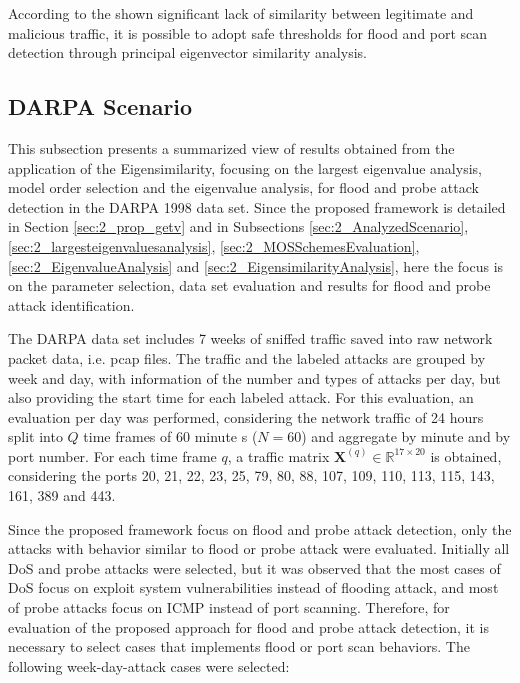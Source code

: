 According to the shown significant lack of similarity between legitimate and malicious traffic, it is possible to adopt safe thresholds for flood and port scan detection through principal eigenvector similarity analysis.

\subsection{DARPA Scenario}
\label{sec:2_DarpaEvaluation}

This subsection presents a summarized view of results obtained from the application of the Eigensimilarity, focusing on the largest eigenvalue analysis, model order selection and the eigenvalue analysis, for flood and probe attack detection in the DARPA 1998 data set. Since the proposed framework is detailed in Section \ref{sec:2_prop_getv} and in Subsections \ref{sec:2_AnalyzedScenario}, \ref{sec:2_largesteigenvaluesanalysis}, \ref{sec:2_MOSSchemesEvaluation}, \ref{sec:2_EigenvalueAnalysis} and \ref{sec:2_EigensimilarityAnalysis}, here the focus is on the parameter selection, data set evaluation and results for flood and probe attack identification.

The DARPA data set includes 7 weeks of sniffed traffic saved into raw network packet data, i.e. pcap files. The traffic and the labeled attacks are grouped by week and day, with information of the number and types of attacks per day, but also providing the start time for each labeled attack. For this evaluation, an evaluation per day was performed, considering the network traffic of 24 hours split into $Q$ time frames of 60 minute
s ($N = 60$) and aggregate by minute and by port number. For each time frame $q$, a traffic matrix $\pmb{X}^{(q)} \in \mathbb{R}^{17 \times 20}$ is obtained, considering the ports 20, 21, 22, 23, 25, 79, 80, 88, 107, 109, 110, 113, 115, 143, 161, 389 and 443.

Since the proposed framework focus on flood and probe attack detection, only the attacks with behavior similar to flood or probe attack were evaluated. Initially all DoS and probe attacks were selected, but it was observed that the most cases of DoS focus on exploit system vulnerabilities instead of flooding attack, and most of probe attacks focus on ICMP instead of port scanning. Therefore, for evaluation of the proposed approach for flood and probe attack detection, it is necessary to select cases that implements flood or port scan behaviors. The following week-day-attack cases  were selected: 

